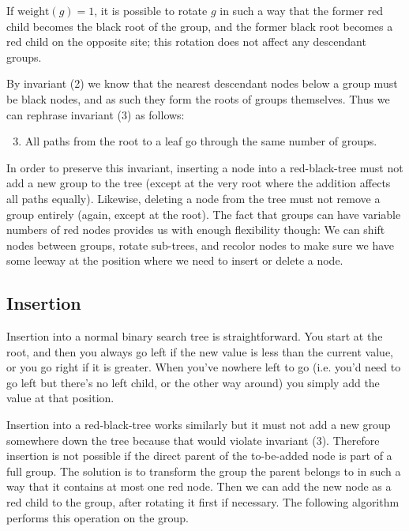 \documentclass{article}
\begin{document}
If \(\text{weight}(g) = 1\), it is possible to rotate \(g\) in such a way that the
former red child becomes the black root of the group, and the former black root becomes
a red child on the opposite site; this rotation does not affect any descendant groups.

By invariant (2) we know that the nearest descendant nodes below a group must be black
nodes, and as such they form the roots of groups themselves.  Thus we can rephrase
invariant (3) as follows:

\begin{enumerate}[label=(\arabic*)]
\setcounter{enumi}{2}
\item All paths from the root to a leaf go through the same number of groups.
\end{enumerate}

In order to preserve this invariant, inserting a node into a red-black-tree must not add
a new group to the tree (except at the very root where the addition affects all paths
equally). Likewise, deleting a node from the tree must not remove a group entirely
(again, except at the root). The fact that groups can have variable numbers of red nodes
provides us with enough flexibility though: We can shift nodes between groups, rotate
sub-trees, and recolor nodes to make sure we have some leeway at the position where we
need to insert or delete a node.

\subsection{Insertion}
Insertion into a normal binary search tree is straightforward. You start at the root,
and then you always go left if the new value is less than the current value, or you go
right if it is greater. When you've nowhere left to go (i.e. you'd need to go left but
there's no left child, or the other way around) you simply add the value at that
position.

Insertion into a red-black-tree works similarly but it must not add a new group
somewhere down the tree because that would violate invariant (3). Therefore insertion is
not possible if the direct parent of the to-be-added node is part of a full group. The
solution is to transform the group the parent belongs to in such a way that it contains
at most one red node. Then we can add the new node as a red child to the group, after
rotating it first if necessary. The following algorithm performs this operation on the
group.
\end{document}
